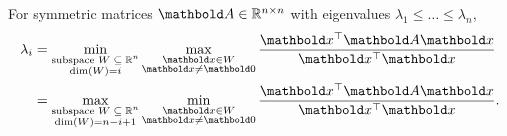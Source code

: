 \begin{thm} For symmetric matrices $\mA \in \R^{n \times n}$ with eigenvalues $\lambda_1 \leq \dots \leq \lambda_n$, \begin{align}
    \lambda_i &= \min_{\substack{\text{subspace $\sW \subseteq \R^n$} \\ \dim(\sW) = i}} \max_{\substack{\vx \in \sW \\ \vx \neq \vZero}} \frac{\trans{\vx}\mA\vx}{\trans{\vx}\vx} \label{eq:courant_fischer_1} \\
    &= \max_{\substack{\text{subspace $\sW \subseteq \R^n$} \\ \dim(\sW) = n - i + 1}} \min_{\substack{\vx \in \sW \\ \vx \neq \vZero}} \frac{\trans{\vx}\mA\vx}{\trans{\vx}\vx}.
\end{align}
\end{thm}

